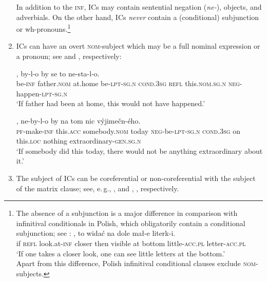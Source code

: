 \documentclass[output=paper,colorlinks,citecolor=brown,
modfonts,newtxmath
]{langscibook}
\begin{document}
\begin{enumerate}
In addition to the \textsc{inf}, ICs may contain sentential negation (\textit{ne-}), objects, and adverbials. On the other hand, ICs \textit{never} contain a (conditional) subjunction or wh-pronouns.\footnote{The absence of a subjunction is a major difference in comparison with infinitival conditionals in Polish, which obligatorily contain a conditional subjunction; see : 
\ea\label{ex:Polish}
, to widać na dole mał-e literk-i.\\ 
     {} if \textsc{refl} look.at-\textsc{inf} closer then visible at bottom little-\textsc{acc.pl} letter-\textsc{acc.pl}\\
\glt `If one takes a closer look, one can see little letters at the bottom.' \\ \hfill \citep[Polish;][455]{EngelKuc1999}
\z
Apart from this difference, Polish infinitival conditional clauses exclude \textsc{nom}-subjects.}

\item ICs can have an overt \textsc{nom}-subject which may be a full nominal expression or a pronoun; see  and , respectively:

\ea\label{ex:father}
, by-l-o by se to ne-sta-l-o.\\
     {} be-\textsc{inf} father.\textsc{nom} {at.home} be-\textsc{lpt-sg.n} \textsc{cond.3sg} \textsc{refl} this.\textsc{nom.sg.n} \textsc{neg}-happen-\textsc{lpt-sg.n}\\
\glt `If father had been at home, this would not have happened.' \\ \hfill \citep[Czech;][65]{Svoboda1960a}
\z

\ea\label{ex:extraordinary}
, ne-by-l-o by na tom nic výjimečn-ého.\\
     {} \textsc{pf}-make-\textsc{inf} this.\textsc{acc} somebody.\textsc{nom} today \textsc{neg}-be-\textsc{lpt-sg.n} \textsc{cond.3sg} on this.\textsc{loc} nothing extraordinary-\textsc{gen.sg.n}\\ 
\glt `If somebody did this today, there would not be anything extraordinary about it.' \hfill \citep[Czech;][1]{Milotova2012}
\z

\item The subject of ICs can be coreferential or non-coreferential with the subject of the matrix clause; see, e.\,g., ,  and , , respectively.


\end{enumerate}
\end{document}
